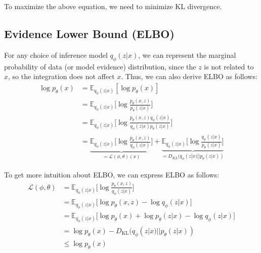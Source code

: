 To maximize the above equation, we need to minimize KL divergence. 




\subsection{Evidence Lower Bound (ELBO)}
For any choice of inference model $q_{\phi}(z|x)$, we can represent the marginal probability of data (or model evidence) distribution, since the $z$ is not related to $x$, so the integration does not affect $x$. Thus, we can also derive ELBO as follows:
\begin{align*}
	\log p_{\theta}(x) &= \mathbb{E}_{q_{\phi}(z|x)}[\log p_{\theta}(x)]\\
	& = \mathbb{E}_{q_{\phi}(z|x)}\Bigg[\log \frac{p_{\theta}(x,z)}{p_{\theta}(z|x)}\Bigg]\\
	& = \mathbb{E}_{q_{\phi}(z|x)}\Bigg[\log \frac{p_{\theta}(x,z)q_{\phi}(z|x)}{q_{\phi}(z|x) p_{\theta}(z|x)}\Bigg]\\
	& = \underbrace{\mathbb{E}_{q_{\phi}(z|x)}\Bigg[\log \frac{p_{\theta}(x,z)}{q_{\phi}(z|x) }\Bigg]}_{=\mathcal{L}(\phi,\theta)(x)}+\underbrace{ \mathbb{E}_{q_{\phi}(z|x)}\Bigg[\log \frac{q_{\phi}(z|x)}{p_{\theta}(z|x)}\Bigg]}_{=D_{KL}(q_{\phi}(z|x)||p_{\theta}(z|x))}
\end{align*}

To get more intuition about ELBO, we can express ELBO as follows:
\begin{align*}
	\mathcal{L}(\phi,\theta) & = \mathbb{E}_{q_{\phi}(z|x)}\Bigg[\log \frac{p_{\theta}(x,z)}{q_{\phi}(z|x) }\Bigg]\\
	& = \mathbb{E}_{q_{\phi}(z|x)}\Bigg[\log p_{\theta}(x,z)-\log q_{\phi}(z|x)\Bigg]\\
	& = \mathbb{E}_{q_{\phi}(z|x)}\Bigg[\log p_{\theta}(x)+\log p_{\theta}(z|x)-\log q_{\phi}(z|x)\Bigg]\\
	& = \log p_{\theta}(x) - D_{\textrm{KL}}(q_{\phi}(z|x)||p_{\theta}(z|x))\\
	& \leq \log p_{\theta}(x)
\end{align*}

